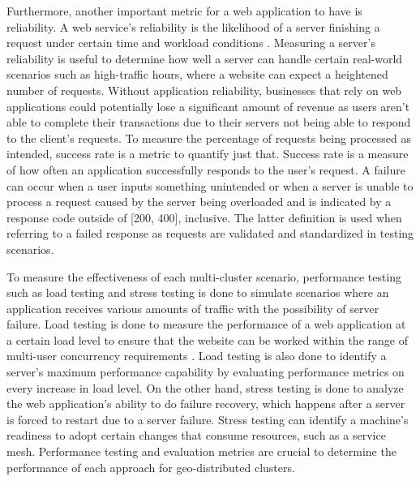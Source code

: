 Furthermore, another important metric for a web application to have is reliability. A web service's reliability is the likelihood of a server finishing a request under certain time and workload conditions  \citep{bhalerao-2019}. Measuring a server's reliability is useful to determine how well a server can handle certain real-world scenarios such as high-traffic hours, where a website can expect a heightened number of requests. Without application reliability, businesses that rely on web applications could potentially lose a significant amount of revenue as users aren't able to complete their transactions due to their servers not being able to respond to the client's requests. To measure the percentage of requests being processed as intended, success rate is a metric to quantify just that. Success rate is a measure of how often an application successfully responds to the user's request. A failure can occur when a user inputs something unintended or when a server is unable to process a request caused by the server being overloaded and is indicated by a response code outside of [200, 400], inclusive. The latter definition is used when referring to a failed response as requests are validated and standardized in testing scenarios. 

To measure the effectiveness of each multi-cluster scenario, performance testing such as load testing and stress testing is done to simulate scenarios where an application receives various amounts of traffic with the possibility of server failure. Load testing is done to measure the performance of a web application at a certain load level to ensure that the website can be worked within the range of multi-user concurrency requirements \citep{yu-2019}. Load testing is also done to identify a server's maximum performance capability by evaluating performance metrics on every increase in load level. On the other hand, stress testing is done to analyze the web application's ability to do failure recovery, which happens after a server is forced to restart due to a server failure. Stress testing can identify a machine's readiness to adopt certain changes that consume resources, such as a service mesh. Performance testing and evaluation metrics are crucial to determine the performance of each approach for geo-distributed clusters.


